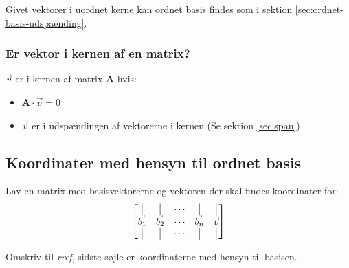 Givet vektorer i uordnet kerne kan ordnet basis findes som i sektion \ref{sec:ordnet-basis-udspaending}.

\subsubsection{Er vektor i kernen af en matrix?}
$\vec{v}$ er i kernen af matrix $\mathbf{A}$ hvis:
\begin{itemize}
    \setlength{\itemsep}{0em}
    \item $\mathbf{A} \cdot \vec{v} = 0$
    \item $\vec{v}$ er i udspændingen af vektorerne i kernen (Se sektion \ref{sec:span})
\end{itemize}


\subsection{Koordinater med hensyn til ordnet basis}
Lav en matrix med basisvektorerne og vektoren der skal findes koordinater for:
\[
    \begin{bmatrix}
        \vline & \vline & \cdots & \vline & \vline \\
        \vec{b_1} & \vec{b_2} & \cdots & \vec{b_n} & \vec{v} \\
        \vline & \vline & \cdots & \vline & \vline \\
    \end{bmatrix}
\]

Omskriv til \emph{rref}, sidste søjle er koordinaterne med hensyn til basisen.

